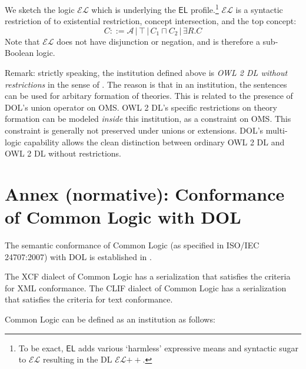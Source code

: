 \documentclass[10pt,fleqn,%
\ifpretendfinal
final%
\else
draft%
\fi,
]{scrreprt}
\newcommand{\EL}{\ensuremath{\mathsf{EL}}\xspace}
\newcommand{\ELDL}{\ensuremath{\mathcal{EL}}\xspace}
\newcommand{\nisref}[1]{#1}
\newcommand{\normannex}[1]{ \chapter{Annex (normative): #1} }
\begin{document}
\begin{definition}
We sketch the logic \ELDL which is underlying the \EL profile.\footnote{To be exact, \EL adds various `harmless' expressive means and syntactic sugar to \ELDL resulting in the DL \ELDL$++$. %
} 
\ELDL is a syntactic restriction of \ALC to existential restriction, concept
intersection, and the top concept:
$$C ::= {\mathcal A} \,|\, \top \,|\,  C_1 \sqcap C_2 \,|\, \exists R . C$$
Note that \ELDL does not have disjunction or negation, and is therefore a sub-Boolean logic.
\end{definition}

Remark: strictly speaking, the institution defined above is
\emph{{OWL} 2 DL without restrictions} in the sense of
\cite{DBLP:conf/owled/SchneiderRS13}. The reason is that in an
institution, the sentences can be used for arbitary formation of
theories. This is related to the presence of DOL's union operator on
OMS.  OWL 2 DL's specific restrictions on theory formation can be
modeled \emph{inside} this institution, as a constraint on OMS.  This
constraint is generally not preserved under unions or
extensions. DOL's multi-logic capability allows the clean distinction
between ordinary OWL 2 DL and {OWL} 2 DL without restrictions.


\normannex{Conformance of Common Logic with DOL}\label{a:cl}

The semantic conformance of Common Logic (as specified in \nisref{ISO/IEC 24707:2007}) with DOL is established in \cite{OntoGraph}.

The XCF dialect of Common Logic has a serialization that satisfies the criteria for XML conformance.  The CLIF dialect of Common Logic has a serialization that satisfies the criteria for text conformance.

Common Logic can be defined as an institution as follows:
\end{document}
